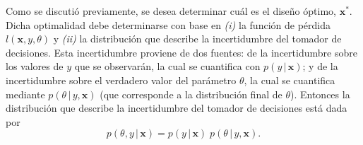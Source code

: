 



Como se discutió previamente, se desea determinar cuál es el diseño óptimo, $\mathbf{x}^*$. Dicha optimalidad debe determinarse con base en \textit{(i)} la función de pérdida $l(\mathbf{x}, y, \theta)$ y \textit{(ii)} la distribución que describe la incertidumbre del tomador de decisiones. Esta incertidumbre proviene de dos fuentes: de la incertidumbre sobre los valores de $y$ que se observarán, la cual se cuantifica con $p(y \, | \, \mathbf{x})$; y de la incertidumbre sobre el verdadero valor del parámetro $\theta$, la cual se cuantifica mediante $p(\theta \, | \, y, \mathbf{x})$ (que corresponde a la distribución final de $\theta$). Entonces la distribución que describe la incertidumbre del tomador de decisiones está dada por
\begin{equation*}
	p(\theta, y \, | \, \mathbf{x}) = p(y \, | \, \mathbf{x}) \; p(\theta \, | \, y, \mathbf{x}).
\end{equation*}


